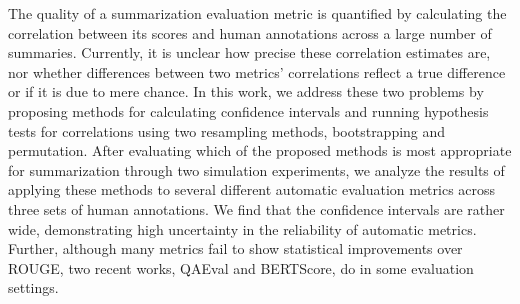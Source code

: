 The quality of a summarization evaluation metric is quantified by calculating the correlation between its scores and human annotations across a large number of summaries. Currently, it is unclear how precise these correlation estimates are, nor whether differences between two metrics' correlations reflect a true difference or if it is due to mere chance. In this work, we address these two problems by proposing methods for calculating confidence intervals and running hypothesis tests for correlations using two resampling methods, bootstrapping and permutation. After evaluating which of the proposed methods is most appropriate for summarization through two simulation experiments, we analyze the results of applying these methods to several different automatic evaluation metrics across three sets of human annotations. We find that the confidence intervals are rather wide, demonstrating high uncertainty in the reliability of automatic metrics. Further, although many metrics fail to show statistical improvements over ROUGE, two recent works, QAEval and BERTScore, do in some evaluation settings.
